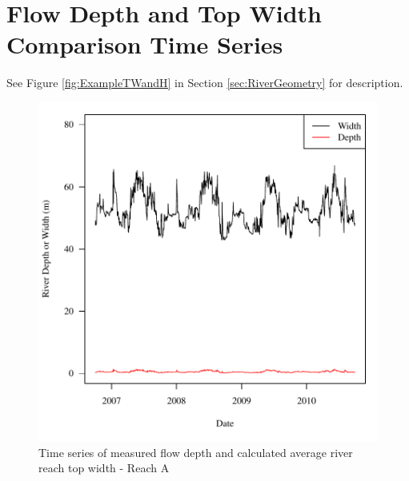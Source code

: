 \section{Flow Depth and Top Width Comparison Time Series}
\label{App:TwandH}
\vspace{12pt}
See Figure \ref{fig:ExampleTWandH} in Section \ref{sec:RiverGeometry} for description.

\begin{center}
\begin{figure}[htbp]
	\includegraphics[width=6in]{"Figures/Results_USR/G d&w Today A"}
	\caption{Time series of measured flow depth and calculated average river reach top width - Reach A}
\end{figure}
\end{center}
\newpage

